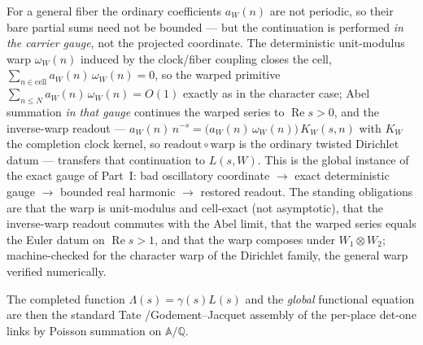 \documentclass[11pt]{article}
\theoremstyle{definition}
\renewcommand{\Re}{\operatorname{Re}}
\begin{document}
For a general fiber the ordinary coefficients $a_W(n)$ are not periodic, so their bare partial sums need
not be bounded --- but the continuation is performed \emph{in the carrier gauge}, not the projected
coordinate. The deterministic unit-modulus warp $\omega_W(n)$ induced by the clock/fiber coupling closes
the cell, $\sum_{n\in\mathrm{cell}}a_W(n)\,\omega_W(n)=0$, so the warped primitive
$\sum_{n\le N}a_W(n)\,\omega_W(n)=O(1)$ exactly as in the character case; Abel summation \emph{in that
gauge} continues the warped series to $\Re s>0$, and the inverse-warp readout --- $a_W(n)\,n^{-s}=
\bigl(a_W(n)\,\omega_W(n)\bigr)\,K_W(s,n)$ with $K_W$ the completion clock kernel, so
$\mathrm{readout}\circ\mathrm{warp}$ is the ordinary twisted Dirichlet datum --- transfers that
continuation to $L(s,W)$. This is the global instance of the exact gauge of Part~I: bad oscillatory
coordinate $\to$ exact deterministic gauge $\to$ bounded real harmonic $\to$ restored readout. The
standing obligations are that the warp is unit-modulus and cell-exact (not asymptotic), that the
inverse-warp readout commutes with the Abel limit, that the warped series equals the Euler datum on
$\Re s>1$, and that the warp composes under $W_1\otimes W_2$; machine-checked for the character warp of the
Dirichlet family, the general warp verified numerically.

The completed function $\Lambda(s)=\gamma(s)L(s)$ and the \emph{global} functional equation are then
the standard Tate \cite{Tate}/Godement--Jacquet \cite{GJa} assembly of the per-place det-one links by
Poisson summation on $\mathbb A/\mathbb Q$.
\end{document}
